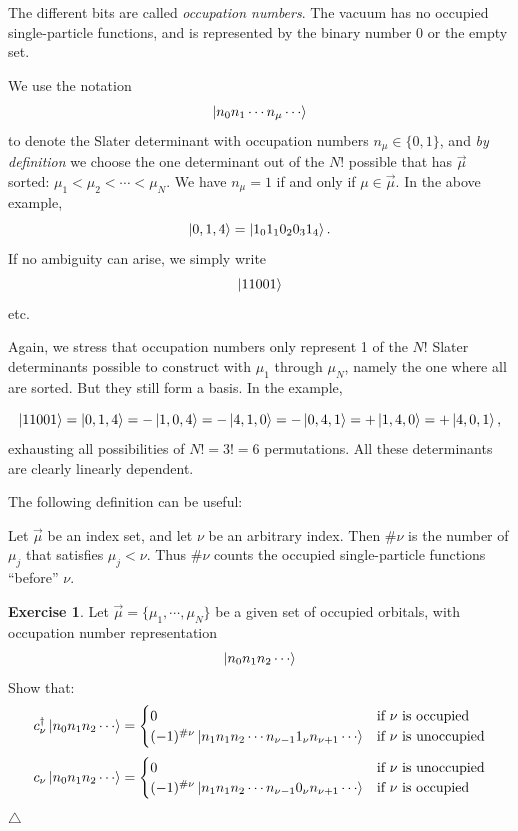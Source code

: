 \documentclass{report}
\theoremstyle{plain}
\theoremstyle{definition}
\newtheorem{exerc}{Exercise}[chapter]
\newcommand\xqed[1]{%
  \leavevmode\unskip\penalty9999 \hbox{}\nobreak\hfill
  \quad\hbox{#1}}
\newcommand\demo{\xqed{$\triangle$}}
\newenvironment{exercise}{\bigskip\begin{exerc}}{\demo\end{exerc}\bigskip}
\begin{document}
The different bits are called \emph{occupation numbers}. The vacuum
has no occupied single-particle functions, and is represented by the
binary number $0$ or the empty set.

We use the notation
\[ \ket{n_0 n_1 \cdots n_\mu \cdots }\] to denote the Slater
determinant with occupation numbers $n_\mu \in \{0, 1\}$, and \emph{by
  definition} we choose the one determinant out of the $N!$ possible
that has $\vec{\mu}$ sorted: $\mu_1<\mu_2<\cdots<\mu_N$. We have
$n_\mu = 1$ if and only if $\mu \in \vec{\mu}$. In the above example,
\begin{equation}
  \ket{0, 1, 4} = \ket{1_0 1_1 0_2 0_3 1_4 }.
\end{equation}
If no ambiguity can arise, we simply write 
\[ \ket{11001} \]
etc.

Again, we stress that occupation numbers only represent 1 of the $N!$
Slater determinants possible to construct with $\mu_1$ through
$\mu_N$, namely the one where all are sorted. But they still form a
basis.
In the example,

\begin{equation}
  \ket{11001} = \ket{0,1,4} = -\ket{1,0,4} = -\ket{4,1,0} =
  -\ket{0,4,1} = +\ket{1,4,0} = +\ket{4,0,1},
\end{equation}
exhausting all possibilities of $N! = 3! = 6$ permutations. All these
determinants are clearly linearly dependent.

The following definition can be useful:

Let $\vec{\mu}$ be an index set, and let $\nu$ be an arbitrary
index. Then $\#\nu$ is the number of $\mu_j$ that satisfies
$\mu_j<\nu$. Thus $\#\nu$ counts the occupied single-particle functions ``before'' $\nu$.

\begin{exercise}\label{exercise:occupation}
  Let $\vec{\mu} = \{\mu_1,\cdots,\mu_N\}$ be a given set of occupied
  orbitals, with occupation number representation
  \[ \ket{n_{0} n_{1} n_{2} \cdots } \]
  Show that:
  \begin{equation}
    c^\dag_\nu \ket{ n_0 n_1 n_2 \cdots } = 
    \begin{cases}
      0 & \text{if $\nu$ is occupied} \\
      (-1)^{\#\nu} \ket { n_1 n_1 n_2 \cdots n_{\nu-1} 1_\nu n_{\nu+1} \cdots} &
      \text{if $\nu$ is unoccupied}
    \end{cases}
  \end{equation}
  \begin{equation}
    c_\nu \ket{ n_0 n_1 n_2 \cdots } = 
    \begin{cases}
      0 & \text{if $\nu$ is unoccupied} \\
      (-1)^{\#\nu} \ket { n_1 n_1 n_2 \cdots n_{\nu-1} 0_\nu n_{\nu+1} \cdots} &
      \text{if $\nu$ is occupied}
    \end{cases}
  \end{equation}
\end{exercise}
\end{document}
